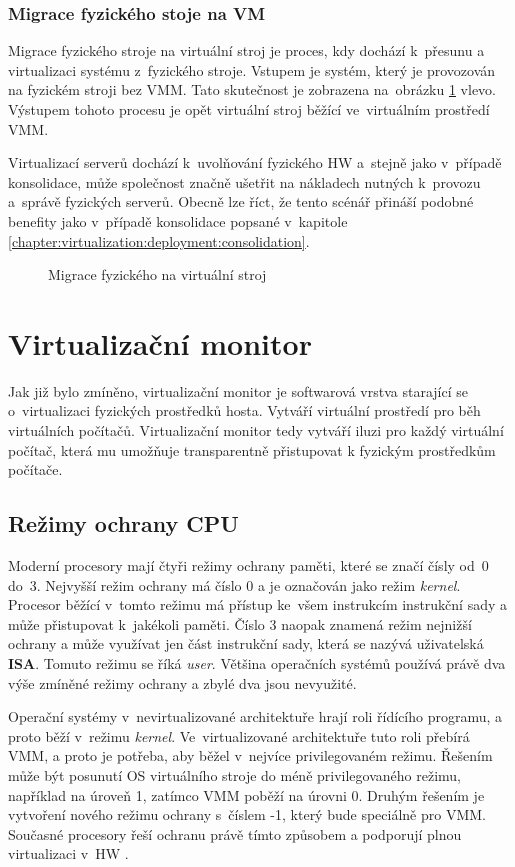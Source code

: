 \subsubsection{Migrace fyzického stoje na VM}
\label{chapter:virtualization:deployment:migration:physical}
Migrace fyzického stroje na virtuální stroj je proces, kdy dochází k~přesunu a virtualizaci systému z~fyzického stroje.
Vstupem je systém, který je provozován na fyzickém stroji bez VMM. Tato skutečnost je zobrazena na~obrázku 
\ref{figure:migration:physical} vlevo. Výstupem tohoto procesu je opět virtuální stroj běžící ve~virtuálním prostředí VMM.

Virtualizací serverů dochází k~uvolňování fyzického HW a~stejně jako v~případě konsolidace, může společnost značně ušetřit
na nákladech nutných k~provozu a~správě fyzických serverů. Obecně lze říct, že tento scénář přináší podobné benefity jako
v~případě konsolidace popsané v~kapitole \ref{chapter:virtualization:deployment:consolidation}.
\begin{figure}
    \centering    
    \caption{Migrace fyzického na virtuální stroj}
    \label{figure:migration:physical}
\end{figure}
\section{Virtualizační monitor}
\label{chapter:virtualization:vmm}
Jak již bylo zmíněno, virtualizační monitor je softwarová vrstva starající se o~virtualizaci fyzických prostředků hosta.
Vytváří virtuální prostředí pro běh virtuálních počítačů. Virtualizační monitor tedy vytváří iluzi pro každý virtuální počítač, která
mu umožňuje transparentně přistupovat k fyzickým prostředkům počítače.
\subsection{Režimy ochrany CPU}
\label{chapter:virtualization:rings}
Moderní procesory mají čtyři režimy ochrany paměti, které se značí čísly od~0 do~3. Nejvyšší režim ochrany má číslo 0 a je
označován jako režim \textit{kernel}. Procesor běžící v~tomto režimu má přístup ke~všem instrukcím instrukční sady a může 
přistupovat k~jakékoli paměti. Číslo 3 naopak znamená režim nejnižší ochrany a může využívat jen část instrukční sady, která
se nazývá uživatelská \textbf{ISA}. Tomuto režimu se říká \textit{user}. Většina operačních systémů používá právě 
dva výše zmíněné režimy ochrany a zbylé dva jsou nevyužité.

Operační systémy v~nevirtualizované architektuře hrají roli řídícího programu, a proto běží v~režimu \textit{kernel}. Ve~virtualizované
architektuře tuto roli přebírá VMM, a proto je potřeba, aby běžel v~nejvíce privilegovaném režimu. Řešením může být posunutí
OS virtuálního stroje do méně privilegovaného režimu, například na úroveň 1, zatímco VMM poběží na úrovni 0. Druhým řešením
je vytvoření nového režimu ochrany s~číslem -1, který bude speciálně pro VMM. Současné procesory řeší ochranu právě tímto
způsobem a podporují plnou virtualizaci v~HW \cite{cvut:presentation:virt2}.

